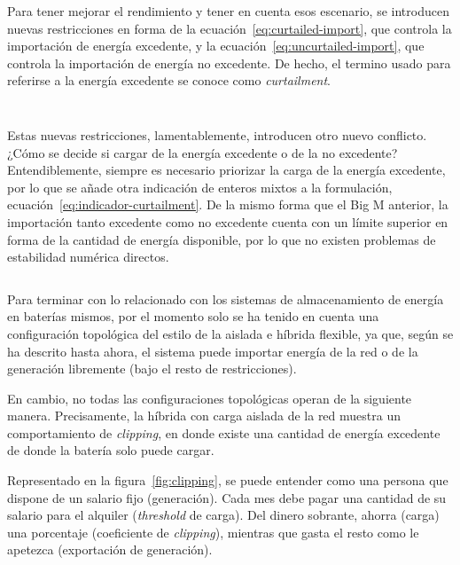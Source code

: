 Para tener mejorar el rendimiento y tener en cuenta esos escenario, se introducen nuevas restricciones en forma de la ecuación~\ref{eq:curtailed-import}, que controla la importación de energía excedente, y la ecuación~\ref{eq:uncurtailed-import}, que controla la importación de energía no excedente. De hecho, el termino usado para referirse a la energía excedente se conoce como \textit{curtailment}.

\begin{equation}
  \label{eq:curtailed-import}
\end{equation}

\begin{equation}
  \label{eq:uncurtailed-import}
\end{equation}

Estas nuevas restricciones, lamentablemente, introducen otro nuevo conflicto. ¿Cómo se decide si cargar de la energía excedente o de la no excedente? Entendiblemente, siempre es necesario priorizar la carga de la energía excedente, por lo que se añade otra indicación de enteros mixtos a la formulación, ecuación~\ref{eq:indicador-curtailment}. De la mismo forma que el Big M anterior, la importación tanto excedente como no excedente cuenta con un límite superior en forma de la cantidad de energía disponible, por lo que no existen problemas de estabilidad numérica directos.

\begin{equation}
  \label{eq:indicador-curtailment}
\end{equation}

Para terminar con lo relacionado con los sistemas de almacenamiento de energía en baterías mismos, por el momento solo se ha tenido en cuenta una configuración topológica del estilo de la aislada e híbrida flexible, ya que, según se ha descrito hasta ahora, el sistema puede importar energía de la red o de la generación libremente (bajo el resto de restricciones).

En cambio, no todas las configuraciones topológicas operan de la siguiente manera. Precisamente, la híbrida con carga aislada de la red muestra un comportamiento de \textit{clipping}, en donde existe una cantidad de energía excedente de donde la batería solo puede cargar.

Representado en la figura~\ref{fig:clipping}, se puede entender como una persona que dispone de un salario fijo (generación). Cada mes debe pagar una cantidad de su salario para el alquiler (\textit{threshold} de carga). Del dinero sobrante, ahorra (carga) una porcentaje (coeficiente de \textit{clipping}), mientras que gasta el resto como le apetezca (exportación de generación).

